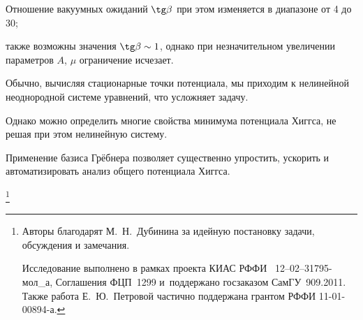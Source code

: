 Отношение вакуумных ожиданий $ \tg \beta$ при этом изменяется в диапазоне от 4 до 30; 

также возможны значения $ \tg  \beta \sim 1$, однако при незначительном увеличении параметров $A$, $\mu$ ограничение исчезает.



Обычно, вычисляя стационарные точки потенциала, мы приходим к нелинейной  неоднородной системе уравнений, что усложняет задачу. 

Однако можно определить многие свойства минимума потенциала Хиггса, не решая при этом нелинейную систему. 

Применение базиса Грёбнера позволяет существенно упростить, ускорить и автоматизировать анализ общего потенциала Хиггса. 



\thanks{Авторы благодарят М.~Н.~Дубинина за идейную постановку задачи, обсуждения и замечания.

Исследование выполнено в рамках проекта КИАС РФФИ \No~12--02--31795-мол\_а,  Соглашения ФЦП~1299 и~поддержано госзаказом СамГУ~909.2011. Также работа Е.~Ю.~Петровой частично поддержана  грантом РФФИ 11-01-00894-а.} 



